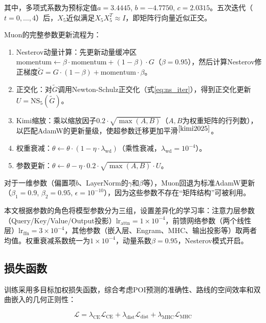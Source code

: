 \documentclass[12pt,a4paper]{ctexart}
\begin{document}
其中，多项式系数为预标定值$a=3.4445$, $b=-4.7750$, $c=2.0315$。五次迭代（$t=0,\dots,4$）后，$X_5$近似满足$X_5X_5^T\approx I$，即矩阵行向量近似正交。

Muon的完整参数更新流程为：

\begin{enumerate}[itemsep=0pt,topsep=0pt]
  \item Nesterov动量计算：先更新动量缓冲区$\text{momentum} \leftarrow \beta\cdot\text{momentum} + (1-\beta)\cdot G$（$\beta=0.95$），然后计算Nesterov修正梯度$\tilde{G} = G \cdot (1-\beta) + \text{momentum}\cdot\beta$。
  \item 正交化：对$\tilde{G}$调用Newton-Schulz正交化（式\ref{eq:ns_iter}），得到正交化更新$U=\text{NS}_5(\tilde{G})$。
  \item Kimi缩放：乘以缩放因子$0.2\cdot\sqrt{\max(A,B)}$（$A,B$为权重矩阵的行列数），以匹配AdamW的更新量级，使超参数迁移更加平滑$^{\cite{kimi2025}}$。
  \item 权重衰减：$\theta\leftarrow\theta\cdot(1-\eta\cdot\lambda_{\text{wd}})$（乘性衰减，$\lambda_{\text{wd}}=10^{-4}$）。
  \item 参数更新：$\theta\leftarrow\theta-\eta\cdot0.2\cdot\sqrt{\max(A,B)}\cdot U$。
\end{enumerate}

对于一维参数（偏置项$b$、LayerNorm的$\gamma$和$\beta$等），Muon回退为标准AdamW更新（$\beta_1=0.9$, $\beta_2=0.95$, $\epsilon=10^{-10}$），因为这些参数不存在“矩阵结构”可被利用。

本文根据参数的角色将模型参数分为三组，设置差异化的学习率：注意力层参数（Query/Key/Value/Output投影）$\text{lr}_{\text{attn}}=1\times10^{-4}$，前馈网络参数（两个线性层）$\text{lr}_{\text{ffn}}=3\times10^{-4}$，其他参数（嵌入层、Engram、MHC、输出投影等）取两者均值。权重衰减系数统一为$1\times10^{-4}$，动量系数$\beta=0.95$，Nesterov模式开启。

\subsection{损失函数}

训练采用多目标加权损失函数，综合考虑POI预测的准确性、路线的空间效率和双曲嵌入的几何正则性：

\begin{equation}
\mathcal{L} = \lambda_{\text{CE}}\mathcal{L}_{\text{CE}} + \lambda_{\text{dist}}\mathcal{L}_{\text{dist}} + \lambda_{\text{MHC}}\mathcal{L}_{\text{MHC}}
\label{eq:total_loss}
\end{equation}
\end{document}
